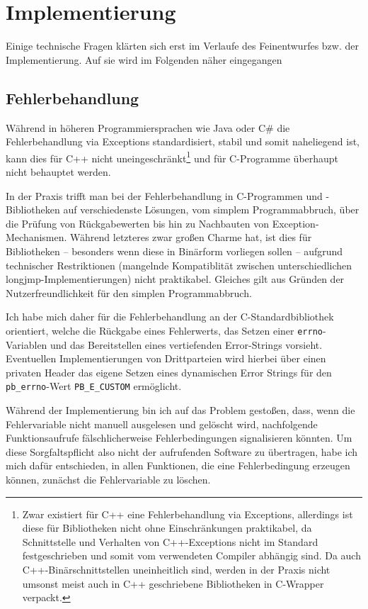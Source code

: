 \section{Implementierung}
Einige technische Fragen klärten sich erst im Verlaufe des Feinentwurfes bzw. der Implementierung.
Auf sie wird im Folgenden näher eingegangen

\subsection{Fehlerbehandlung}
Während in höheren Programmiersprachen wie Java oder C\# die Fehlerbehandlung via Exceptions standardisiert, stabil
und somit naheliegend ist, kann dies für C++ nicht uneingeschränkt\footnote{Zwar existiert für C++ eine Fehlerbehandlung
via Exceptions, allerdings ist diese für Bibliotheken nicht ohne Einschränkungen praktikabel, da Schnittstelle und
Verhalten von C++-Exceptions nicht im Standard festgeschrieben und somit vom verwendeten Compiler abhängig sind.
Da auch C++-Binärschnittstellen uneinheitlich sind, werden in der Praxis nicht umsonst meist auch in C++ geschriebene
Bibliotheken in C-Wrapper verpackt.} und für C-Programme überhaupt nicht behauptet werden.

In der Praxis trifft man bei der Fehlerbehandlung in C-Programmen und -Bibliotheken auf verschiedenste Lösungen, vom
simplem Programmabbruch, über die Prüfung von Rückgabewerten bis hin zu Nachbauten von Exception-Mechanismen.
Während letzteres zwar großen Charme hat, ist dies für Bibliotheken -- besonders wenn diese in Binärform vorliegen
sollen -- aufgrund technischer Restriktionen (mangelnde Kompatiblität zwischen unterschiedlichen
longjmp-Implementierungen) nicht praktikabel. Gleiches gilt aus Gründen der Nutzerfreundlichkeit für den simplen
Programmabbruch.

Ich habe mich daher für die Fehlerbehandlung an der C-Standardbibliothek orientiert, welche die Rückgabe eines
Fehlerwerts, das Setzen einer \lstinline{errno}-Variablen und das Bereitstellen eines vertiefenden Error-Strings vorsieht.
Eventuellen Implementierungen von Drittparteien wird hierbei über einen privaten Header das eigene Setzen eines
dynamischen Error Strings für den \lstinline{pb_errno}-Wert \lstinline{PB_E_CUSTOM} ermöglicht.

Während der Implementierung bin ich auf das Problem gestoßen, dass, wenn die Fehlervariable nicht manuell ausgelesen und
gelöscht wird, nachfolgende Funktionsaufrufe fälschlicherweise Fehlerbedingungen signalisieren könnten. Um diese
Sorgfaltspflicht also nicht der aufrufenden Software zu übertragen, habe ich mich dafür entschieden, in allen Funktionen,
die eine Fehlerbedingung erzeugen können, zunächst die Fehlervariable zu löschen.

